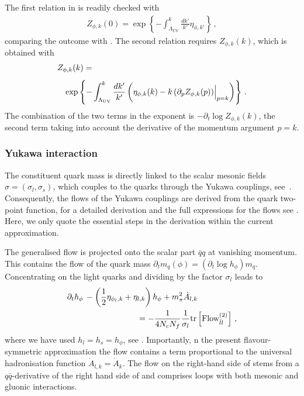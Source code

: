 \documentclass[aps,twocolumn,prd,superscriptaddress]{revtex4-2}
\begin{document}
The first relation in  is readily checked with 
%
\begin{align}\label{eq:Zatkandp0}
Z_{\phi,k}(0) = \exp\left\{- \int_{\Lambda_\textrm{UV}}^k \frac{d k'}{k'} \eta_{\phi,k'}\right\}\,, 
\end{align}
%
comparing the outcome with . The second relation requires $Z_{\phi,k}(k)$, which is obtained with 
%
\begin{align}\label{eq:etaBarPhik}
&Z_{\phi,k}(k)= \notag\\[1ex]
&\hspace{3mm} \exp\left\{- \int_{\Lambda_\textrm{UV}}^k \frac{d k'}{k'} \left( \eta_{\phi,k}(k) - k \,(\partial_p Z_{\phi,k}(p))\Big\vert_{p=k}\right)\right\}\,.
\end{align}
%
The combination of the two terms in the exponent is $-\partial_t \log Z_{\phi,k}(k)$, the second term taking into account the derivative of the momentum argument $p=k$. 


\subsubsection{Yukawa interaction}
\label{sec:Yukawa}

The constituent quark mass is directly linked to the scalar mesonic fields $\sigma=(\sigma_l,\sigma_s)$, which couples to the quarks through the Yukawa couplings, see~. Consequently, the flows of the Yukawa couplings are derived from the quark two-point function, for a detailed derivation and the full expressions for the flows see \cite{Fu:2019hdw}. Here, we only quote the essential steps in the derivation within the current approximation. 

The generalised flow  is projected onto the scalar part $\bar q q$ at vanishing momentum. This contains the flow of the quark mass $\partial_t m_q(\phi)= (\partial_t \log h_\phi) m_q$. Concentrating on the light quarks and dividing by the factor $\sigma_l$ leads to  
%
\begin{align}
	&\partial_t h_\phi \, - \left(\frac12 \eta_{\phi_l,k} + \eta_{l,k} \right) h_\phi+ m_\pi^2 \dot{ A}_{l,k} \notag\\
	& \hspace{3cm}= - \frac{1}{4 N_c N_f } \frac{1}{\sigma_l} \mathrm{tr} \left[\textrm{Flow}_{\bar ll}^{(2)}\right]\,, 
\label{eq:yukFlow}
\end{align}
%
where we have used $h_l=h_s=h_\phi$, see . Importantly, n the present flavour-symmetric approximation the flow contains a term proportional to the universal hadronisation function $\dot{A}_{l,k}=\dot A_k$. The flow on the right-hand side of  stems from a $q\bar q$-derivative of the right hand side of  and comprises loops with both mesonic and gluonic interactions. 
\end{document}
